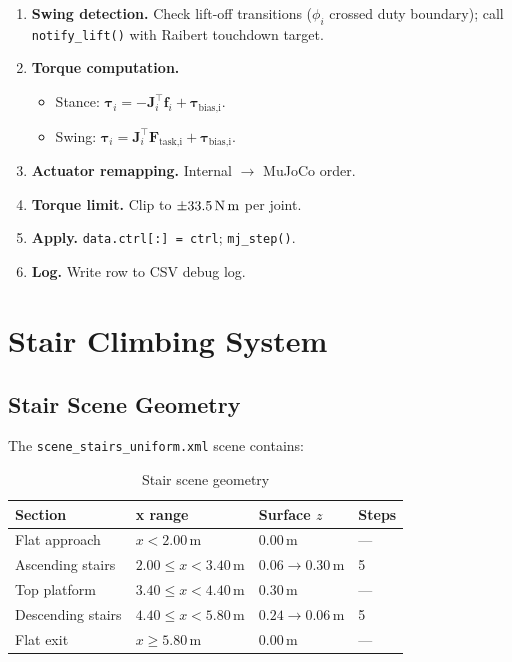 \documentclass[12pt,a4paper]{report}
\newcommand{\vect}[1]{\bm{#1}}
\newcommand{\mat}[1]{\mathbf{#1}}
\begin{document}
\begin{enumerate}
    \item \textbf{Swing detection.} Check lift-off transitions
          ($\phi_i$ crossed duty boundary); call \texttt{notify\_lift()} with
          Raibert touchdown target.

    \item \textbf{Torque computation.}
          \begin{itemize}[noitemsep]
            \item Stance: $\vect{\tau}_i = -\mat{J}_i^\top\vect{f}_i + \vect{\tau}_\text{bias,i}$.
            \item Swing: $\vect{\tau}_i = \mat{J}_i^\top\vect{F}_\text{task,i} + \vect{\tau}_\text{bias,i}$.
          \end{itemize}

    \item \textbf{Actuator remapping.} Internal $\to$ MuJoCo order.

    \item \textbf{Torque limit.} Clip to $\pm 33.5\,\text{N\,m}$ per joint.

    \item \textbf{Apply.} \texttt{data.ctrl[:] = ctrl}; \texttt{mj\_step()}.

    \item \textbf{Log.} Write row to CSV debug log.
\end{enumerate}

\chapter{Stair Climbing System}
\label{ch:stairs}

\section{Stair Scene Geometry}

The \texttt{scene\_stairs\_uniform.xml} scene contains:

\begin{table}[H]
\centering
\caption{Stair scene geometry}
\begin{tabular}{llll}
\toprule
\textbf{Section} & \textbf{x range} & \textbf{Surface $z$} & \textbf{Steps} \\
\midrule
Flat approach   & $x < 2.00\,\text{m}$           & $0.00\,\text{m}$  & — \\
Ascending stairs& $2.00 \leq x < 3.40\,\text{m}$ & $0.06 \to 0.30\,\text{m}$ & 5 \\
Top platform    & $3.40 \leq x < 4.40\,\text{m}$ & $0.30\,\text{m}$  & — \\
Descending stairs & $4.40 \leq x < 5.80\,\text{m}$ & $0.24 \to 0.06\,\text{m}$ & 5 \\
Flat exit       & $x \geq 5.80\,\text{m}$         & $0.00\,\text{m}$  & — \\
\bottomrule
\end{tabular}
\end{table}
\end{document}
